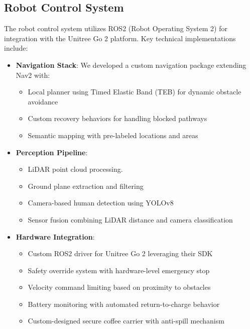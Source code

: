 \documentclass[12pt]{article}
\begin{document}
\subsection{Robot Control System}

The robot control system utilizes ROS2 (Robot Operating System 2) for integration with the Unitree Go 2 platform. Key technical implementations include:

\begin{itemize}
    \item \textbf{Navigation Stack}: We developed a custom navigation package extending Nav2 with:
    \begin{itemize}
        \item Local planner using Timed Elastic Band (TEB) for dynamic obstacle avoidance
        \item Custom recovery behaviors for handling blocked pathways
        \item Semantic mapping with pre-labeled locations and areas
    \end{itemize}
    
    \item \textbf{Perception Pipeline}:
    \begin{itemize}
        \item LiDAR point cloud processing.
        \item Ground plane extraction and filtering
        \item Camera-based human detection using YOLOv8
        \item Sensor fusion combining LiDAR distance and camera classification
    \end{itemize}
    
    \item \textbf{Hardware Integration}:
    \begin{itemize}
        \item Custom ROS2 driver for Unitree Go 2 leveraging their SDK
        \item Safety override system with hardware-level emergency stop
        \item Velocity command limiting based on proximity to obstacles
        \item Battery monitoring with automated return-to-charge behavior
        \item Custom-designed secure coffee carrier with anti-spill mechanism
    \end{itemize}
    

\end{itemize}
\end{document}
